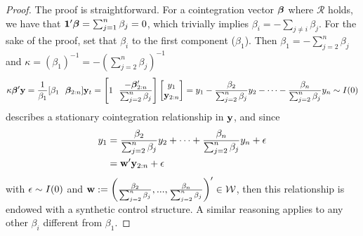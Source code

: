 \begin{proof}
The proof is straightforward. For a cointegration vector $\boldsymbol \beta$ where $\mathcal R$ holds, we have that $\mathbf 1'\boldsymbol \beta = \sum_{j=1}^n \beta_j= 0$, which trivially implies $\beta_i = -\sum_{j\neq i}\beta _j$. For the sake of the proof, set that $\beta_i$ to the first component ($\beta_1$). Then
$\beta_1 = -\sum_{j=2}^n \beta_j$ and $\kappa = (\beta_1)^{-1} = -(\sum_{j=2}^n \beta_j)^{-1}$
$$
\kappa \boldsymbol \beta' \mathbf y 
= 
\frac{1}{\beta_1} [\beta_1 ~~ \boldsymbol \beta_{2:n}] \mathbf y_t 
=
\left[1 ~~ \frac{-\boldsymbol \beta'_{2:n}}{\sum_{j=2}^n\beta_j}\right]
\left[\begin{matrix} y_1 \\ \mathbf y_{2:n} \end{matrix}\right]
=
y_1 - \frac{\beta_2}{\sum_{j=2}^n \beta_j}y_2 - \cdots - 
\frac{\beta_n}{\sum_{j=2}^n \beta_j} y_n
\sim I(0)
$$
describes a stationary cointegration relationship in $\mathbf y$, and since
\begin{align*}
y_1 
&= \frac{\beta_2}{\sum_{j=2}^n \beta_j}y_2 + \cdots + 
\frac{\beta_n}{\sum_{j=2}^n \beta_j} y_n + \epsilon 
\\&= \mathbf w' \mathbf y_{2:n} + \epsilon 
\end{align*}
with $\epsilon\sim I(0)$ and $\mathbf w:=\left(\frac{\beta_2}{\sum_{j=2}^n \beta_j}, ..., \frac{\beta_n}{\sum_{j=2}^n \beta_j}\right)'\in \mathcal{W}$, then this relationship is endowed with a synthetic control structure. A similar reasoning applies to any other $\beta_i$ different from $\beta_1$.
\end{proof}